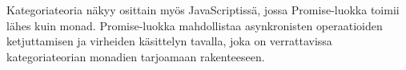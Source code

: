 Kategoriateoria näkyy osittain myös JavaScriptissä, jossa Promise-luokka toimii lähes kuin \gls{monad}. Promise-luokka mahdollistaa asynkronisten operaatioiden ketjuttamisen ja virheiden käsittelyn tavalla, joka on verrattavissa kategoriateorian monadien tarjoamaan rakenteeseen. \citep{promises-spec-94}












